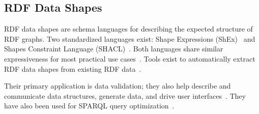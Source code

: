 \subsection{RDF Data Shapes}

RDF data shapes are schema languages for describing the expected structure of RDF graphs.
Two standardized languages exist: Shape Expressions (ShEx)~\cite{Gayo2018,Boneva2017} and Shapes Constraint Language (SHACL)~\cite{Gayo2018b}.
Both languages share similar expressiveness for most practical use cases~\cite{Gayo2018c}.
Tools exist to automatically extract RDF data shapes from existing RDF data~\cite{fernandez2023extracting}.

Their primary application is data validation; they also help describe and communicate data structures, generate data, and drive user interfaces~\cite{Gayo2018a,Gayo2018c}.
They have also been used for SPARQL query optimization~\cite{Abbas2018,kashif2021}.
